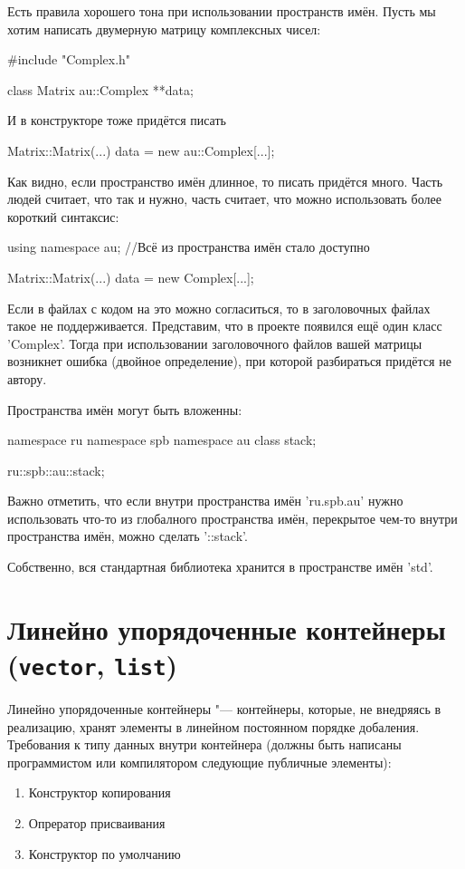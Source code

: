 Есть правила хорошего тона при использовании пространств имён. Пусть мы хотим написать двумерную матрицу комплексных чисел:
\begin{cppcode}
#include "Complex.h"
 
class Matrix
{
	au::Complex **data;
}
\end{cppcode}
И в конструкторе тоже придётся писать
\begin{cppcode}
Matrix::Matrix(...)
{
	data = new au::Complex[...];
}
\end{cppcode}
 
Как видно, если пространство имён длинное, то писать придётся много.
Часть людей считает, что так и нужно, часть считает, что можно использовать более короткий синтаксис:
\begin{cppcode}
using namespace au; //Всё из пространства имён стало доступно
 
Matrix::Matrix(...)
{
	data = new Complex[...];
}
\end{cppcode}
Если в файлах с кодом на это можно согласиться, то в заголовочных файлах такое не поддерживается.
Представим, что в проекте появился ещё один класс \cpp'Complex'.
Тогда при использовании заголовочного файлов вашей матрицы возникнет ошибка (двойное определение), при которой разбираться придётся не автору.
 
Пространства имён могут быть вложенны:
\begin{cppcode}
namespace ru
{
	namespace spb
	{
		namespace au
		{
			class stack;
		}
	}
}
 
ru::spb::au::stack;
\end{cppcode}
 
Важно отметить, что если внутри пространства имён \cpp'ru.spb.au' нужно использовать что-то из глобалного пространства имён, перекрытое чем-то внутри пространства имён, можно сделать \cpp'::stack'.
 
Собственно, вся стандартная библиотека хранится в пространстве имён \cpp'std'.
 
\section{Линейно упорядоченные контейнеры (\texttt{vector}, \texttt{list})}
 
Линейно упорядоченные контейнеры "--- контейнеры, которые, не внедряясь в реализацию, хранят элементы в линейном постоянном порядке добаления. Требования к типу данных внутри контейнера (должны быть написаны программистом или компилятором следующие публичные элементы):
\begin{enumerate}
	\item Конструктор копирования
	\item Опрератор присваивания
	\item Конструктор по умолчанию
\end{enumerate}
 
